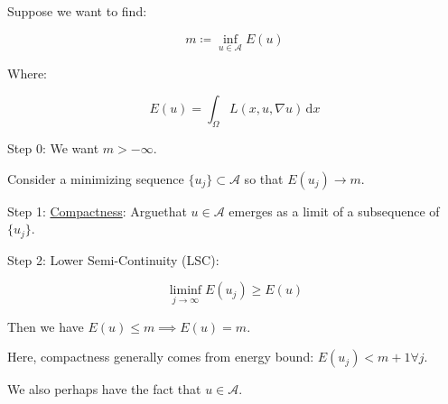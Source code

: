 \documentclass{article}
\theoremstyle{definition}
\begin{document}
Suppose we want to find:

\[
    m \coloneqq \inf_{u\in \mathcal{A}} E(u)
\]

Where:

\[
    E(u) = \int_{\Omega} L(x,u,\nabla u) \,\mathrm{d}x 
\]

Step 0: We want \(m > - \infty\).

Consider a minimizing sequence \(\{ u_j \} \subset \mathcal{A}\) so that \(E(u_j) \to m\).

Step 1: \underline{Compactness}: Arguethat \(u\in \mathcal{A}\) emerges as a limit of a subsequence of \(\{ u_j \}\).

Step 2: Lower Semi-Continuity (LSC):

\[
    \liminf_{j \to \infty} E(u_j) \geq E(u)
\]

Then we have \(E(u) \leq m \implies E(u) = m\).

Here, compactness generally comes from energy bound: \(E(u_j) < m+1 \forall j\).

We also perhaps have the fact that \(u \in \mathcal{A}\).
\end{document}

